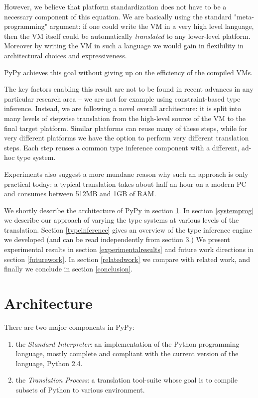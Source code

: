 \documentclass{acm_proc_article-sp}
\begin{document}
However, we believe that platform standardization does not have to be
a necessary component of this equation.  We are basically using the
standard "meta-programming" argument: if one could write the VM in a
very high level language, then the VM itself could be automatically
\textit{translated} to any lower-level platform.  Moreover by writing
the VM in such a language we would gain in flexibility in
architectural choices and expressiveness.

PyPy achieves this goal without giving up on the efficiency of the
compiled VMs.  

The key factors enabling this result are not to be found in recent
advances in any particular research area -- we are not for example using
constraint-based type inference.  Instead, we are following a novel
overall architecture: it is split into many levels of stepwise
translation from the high-level source of the VM to the final target
platform.  Similar platforms can reuse many of these steps, while for
very different platforms we have the option to perform very different
translation steps.  Each step reuses a common type inference component
with a different, ad-hoc type system.

Experiments also suggest a more mundane reason why such an approach is
only practical today: a typical translation takes about half an hour
on a modern PC and consumes between 512MB and 1GB of RAM.

We shortly describe the architecture of PyPy in section
\ref{architecture}.  In section \ref{systemprog} we describe our
approach of varying the type systems at various levels of the
translation.  Section \ref{typeinference} gives an overview of the
type inference engine we developed (and can be read independently from
section 3.)  We present experimental results in section
\ref{experimentalresults} and future work directions in section
\ref{futurework}.  In section \ref{relatedwork} we compare with
related work, and finally we conclude in section \ref{conclusion}.

\section{Architecture}
\label{architecture}

There are two major components in PyPy:

\begin{enumerate}
\item the \textit{Standard Interpreter}: an implementation of the Python programming
language, mostly complete and compliant with the current version of the
language, Python 2.4.
\item the \textit{Translation Process}: a translation tool-suite whose goal is to
compile subsets of Python to various environment.
\end{enumerate}
\end{document}
